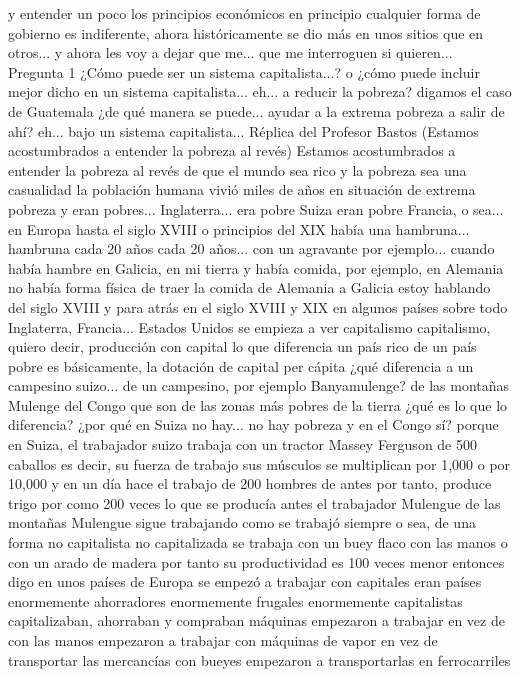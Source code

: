 y entender un poco los principios económicos en principio cualquier forma de gobierno es indiferente, ahora históricamente
se dio más en unos sitios que en otros... y ahora les voy a dejar que me... que me interroguen si quieren...
Pregunta 1
¿Cómo puede ser un sistema capitalista...? o ¿cómo puede incluir mejor dicho en un sistema capitalista...
eh... a reducir la pobreza? digamos el caso de Guatemala ¿de qué manera se puede...
ayudar a la extrema pobreza a salir de ahí? eh... bajo un sistema capitalista...
Réplica del Profesor Bastos (Estamos acostumbrados a entender la pobreza al revés)
Estamos acostumbrados a entender la pobreza al revés de que el mundo sea rico y la pobreza sea una casualidad
la población humana vivió miles de años en situación de extrema pobreza y eran pobres...
Inglaterra... era pobre Suiza eran pobre Francia, o sea... en Europa
hasta el siglo XVIII o principios del XIX había una hambruna... hambruna
cada 20 años cada 20 años... con un agravante por ejemplo...
cuando había hambre en Galicia, en mi tierra y había comida, por ejemplo, en Alemania
no había forma física de traer la comida de Alemania a Galicia estoy hablando del siglo XVIII y para atrás
en el siglo XVIII y XIX en algunos países sobre todo Inglaterra, Francia...
Estados Unidos se empieza a ver capitalismo capitalismo, quiero decir, producción con capital
lo que diferencia un país rico de un país pobre es básicamente, la dotación de capital per cápita
¿qué diferencia a un campesino suizo... de un campesino, por ejemplo Banyamulenge?
de las montañas Mulenge del Congo que son de las zonas más pobres de la tierra ¿qué es lo que lo diferencia?
¿por qué en Suiza no hay... no hay pobreza y en el Congo sí? porque en Suiza, el trabajador suizo
trabaja con un tractor Massey Ferguson de 500 caballos es decir, su fuerza de trabajo
sus músculos se multiplican por 1,000 o por 10,000 y en un día hace el trabajo de 200 hombres de antes
por tanto, produce trigo por como 200 veces lo que se producía antes el trabajador Mulengue de las montañas Mulengue
sigue trabajando como se trabajó siempre o sea, de una forma no capitalista no capitalizada se trabaja con un buey flaco
con las manos o con un arado de madera por tanto su productividad es 100 veces menor entonces digo
en unos países de Europa se empezó a trabajar con capitales eran países enormemente ahorradores enormemente frugales
enormemente capitalistas capitalizaban, ahorraban y compraban máquinas empezaron a trabajar en vez de con las manos
empezaron a trabajar con máquinas de vapor en vez de transportar las mercancías con bueyes empezaron a transportarlas en ferrocarriles
